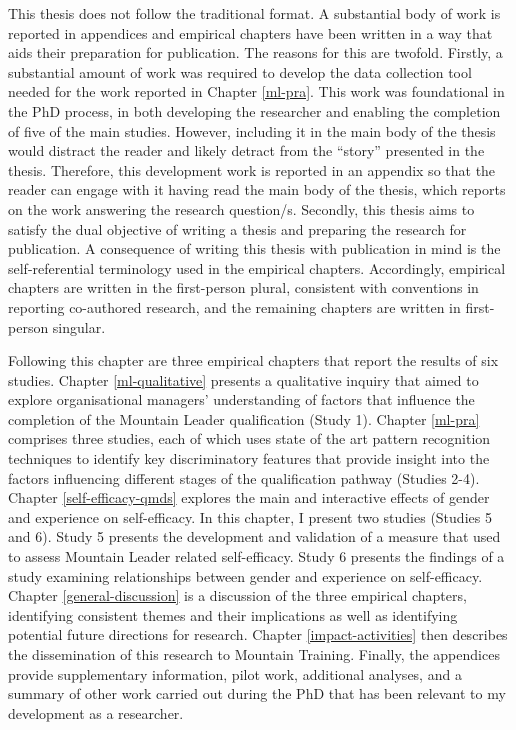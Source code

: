 \documentclass[
  12pt,
  a4paper,
]{book}
\begin{document}
This thesis does not follow the traditional format. A substantial body of work is reported in appendices and empirical chapters have been written in a way that aids their preparation for publication. The reasons for this are twofold. Firstly, a substantial amount of work was required to develop the data collection tool needed for the work reported in Chapter \ref{ml-pra}. This work was foundational in the PhD process, in both developing the researcher and enabling the completion of five of the main studies. However, including it in the main body of the thesis would distract the reader and likely detract from the ``story'' presented in the thesis. Therefore, this development work is reported in an appendix so that the reader can engage with it having read the main body of the thesis, which reports on the work answering the research question/s. Secondly, this thesis aims to satisfy the dual objective of writing a thesis and preparing the research for publication. A consequence of writing this thesis with publication in mind is the self-referential terminology used in the empirical chapters. Accordingly, empirical chapters are written in the first-person plural, consistent with conventions in reporting co-authored research, and the remaining chapters are written in first-person singular.

Following this chapter are three empirical chapters that report the results of six studies.
Chapter \ref{ml-qualitative} presents a qualitative inquiry that aimed to explore organisational managers' understanding of factors that influence the completion of the Mountain Leader qualification (Study 1).
Chapter \ref{ml-pra} comprises three studies, each of which uses state of the art pattern recognition techniques to identify key discriminatory features that provide insight into the factors influencing different stages of the qualification pathway (Studies 2-4).
Chapter \ref{self-efficacy-qmds} explores the main and interactive effects of gender and experience on self-efficacy. In this chapter, I present two studies (Studies 5 and 6). Study 5 presents the development and validation of a measure that used to assess Mountain Leader related self-efficacy. Study 6 presents the findings of a study examining relationships between gender and experience on self-efficacy.
Chapter \ref{general-discussion} is a discussion of the three empirical chapters, identifying consistent themes and their implications as well as identifying potential future directions for research.
Chapter \ref{impact-activities} then describes the dissemination of this research to Mountain Training.
Finally, the appendices provide supplementary information, pilot work, additional analyses, and a summary of other work carried out during the PhD that has been relevant to my development as a researcher.
\end{document}

